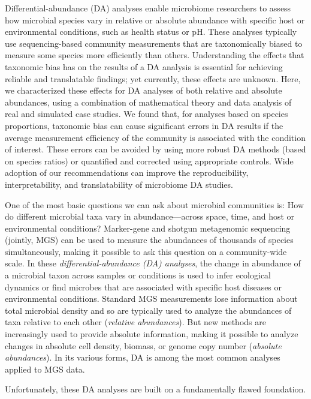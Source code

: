 \documentclass[
]{article}
\begin{document}
Differential-abundance (DA) analyses enable microbiome researchers to assess how microbial species vary in relative or absolute abundance with specific host or environmental conditions, such as health status or pH.
These analyses typically use sequencing-based community measurements that are taxonomically biased to measure some species more efficiently than others.
Understanding the effects that taxonomic bias has on the results of a DA analysis is essential for achieving reliable and translatable findings; yet currently, these effects are unknown.
Here, we characterized these effects for DA analyses of both relative and absolute abundances, using a combination of mathematical theory and data analysis of real and simulated case studies.
We found that, for analyses based on species proportions, taxonomic bias can cause significant errors in DA results if the average measurement efficiency of the community is associated with the condition of interest.
These errors can be avoided by using more robust DA methods (based on species ratios) or quantified and corrected using appropriate controls.
Wide adoption of our recommendations can improve the reproducibility, interpretability, and translatability of microbiome DA studies.

One of the most basic questions we can ask about microbial communities is: How do different microbial taxa vary in abundance---across space, time, and host or environmental conditions?
Marker-gene and shotgun metagenomic sequencing (jointly, MGS) can be used to measure the abundances of thousands of species simultaneously, making it possible to ask this question on a community-wide scale.
In these \emph{differential-abundance (DA) analyses}, the change in abundance of a microbial taxon across samples or conditions is used to infer ecological dynamics or find microbes that are associated with specific host diseases or environmental conditions.
Standard MGS measurements lose information about total microbial density and so are typically used to analyze the abundances of taxa relative to each other (\emph{relative abundances}).
But new methods are increasingly used to provide absolute information, making it possible to analyze changes in absolute cell density, biomass, or genome copy number (\emph{absolute abundances}).
In its various forms, DA is among the most common analyses applied to MGS data.

Unfortunately, these DA analyses are built on a fundamentally flawed foundation.
\end{document}
